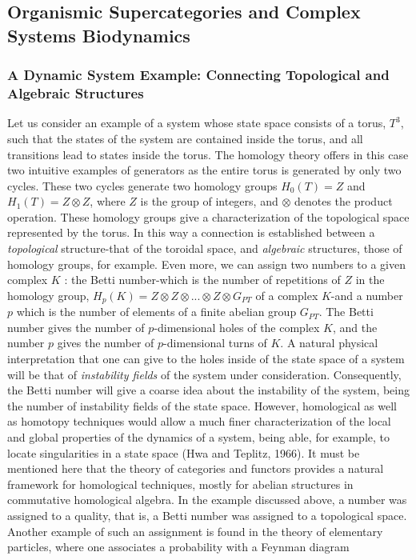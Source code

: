 \documentclass[12pt]{article}
\theoremstyle{plain}
\theoremstyle{definition}
\numberwithin{equation}{section}
\newcommand{\<}{{\langle}}
\begin{document}
\subsection{Organismic Supercategories and Complex Systems Biodynamics}

\subsubsection{A Dynamic System Example: Connecting Topological and Algebraic Structures} 

 Let us consider an example of a system whose state space consists of a torus, $T^3$,  such that the states of the system are contained inside the torus, and all transitions lead to states inside the torus. The homology theory offers in this case two intuitive examples of generators as the entire torus is generated by only two cycles. 
These two cycles generate two homology groups $H_0(T) = Z$ and $H_1(T) = Z \otimes Z$, where $Z$ is the group of integers, and $\otimes$ denotes the product operation. These homology groups give a characterization of the topological space represented by the torus. In this way a connection is established between a \emph{topological} structure-that of the toroidal space, and \emph{algebraic} structures, those of homology groups, for example. Even more, we can assign two numbers to a given complex $K$ : the Betti number-which is the number of repetitions of $Z$ in the homology group, 
$H_p(K) = Z \otimes Z \otimes ... \otimes Z \otimes  G_{PT}$  of a complex $K$-and a number $p$ which is the number of elements of a finite abelian group $G_{PT}$. The Betti number gives the number of $p$-dimensional holes of the complex $K$, and the number $p$ gives the number of $p$-dimensional turns of $K$.
A natural physical interpretation that one can give to the holes inside of the state space of a system will be that of \emph{instability fields} of the system under consideration. Consequently, the Betti number will give a coarse idea about the instability of the system, being the number of instability fields of the state space. However, homological as well as homotopy techniques would allow a much finer characterization of the local and global properties of the dynamics of a system, being able, for example, to locate singularities in a state space (Hwa and Teplitz, 1966). It must be mentioned here that the theory of categories and functors provides a natural framework for homological techniques, mostly for abelian structures in commutative homological algebra. In the example discussed above, a number was assigned to a quality, that is, a Betti number was assigned to a topological space. Another example of such an assignment is found in the theory of elementary particles, where one associates a probability with a Feynman diagram
\end{document}
